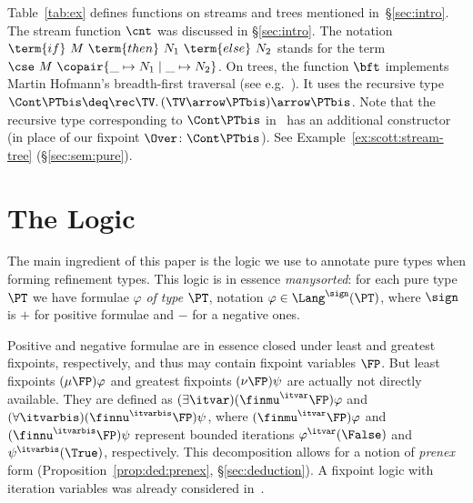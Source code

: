 \begin{example}
\label{ex:pure:fun}
Table~\ref{tab:ex} defines functions on streams and trees
mentioned in~\S\ref{sec:intro}.
%
The stream function $\cnt$ was discussed in \S\ref{sec:intro}.
The notation
$\term{if}~ M ~\term{then}~ N_{1} ~\term{else}~ N_{2}$
stands for the term
$\cse\ M\ \copair{\_ \mapsto N_1 \mid \_ \mapsto N_2}$.
%
On trees, the function $\bft$ implements Martin Hofmann's breadth-first traversal
(see e.g.~\cite{bms19types,jr21esop,rk25wollic,kw26popl}).
It uses the recursive type
$\Cont \PTbis \deq \rec\TV.\, (\TV \arrow \PTbis) \arrow \PTbis$.
Note that the recursive type corresponding to $\Cont \PTbis$
in~\cite{bms19types,jr21esop,kw26popl}
has an additional constructor
(in place of our fixpoint $\Over \colon \Cont\PTbis$).
See Example~\ref{ex:scott:stream-tree} (\S\ref{sec:sem:pure}).
\lipicsEnd
\end{example}




\section{The Logic}
\label{sec:log}

The main ingredient of this paper is the logic 
we use to annotate pure types when forming refinement types.
This logic is in essence \emph{manysorted}:
for each pure type $\PT$ we have formulae $\varphi$ \emph{of type $\PT$},
notation $\varphi \in \Lang^\sign(\PT)$,
where $\sign$ is $+$ for positive formulae and $-$ for a negative ones.

Positive and negative formulae are in essence closed under
least and greatest fixpoints, respectively,
and thus may contain fixpoint variables $\FP$.
%
But least fixpoints $(\mu \FP)\varphi$
and greatest fixpoints $(\nu \FP)\psi$ are actually not directly available.
They are defined %
as $(\exists \itvar)(\finmu^\itvar \FP)\varphi$
and $(\forall \itvarbis)(\finnu^\itvarbis \FP)\psi$,
where $(\finmu^\itvar \FP)\varphi$ and $(\finnu^\itvarbis \FP)\psi$
represent bounded iterations
$\varphi^{\itvar}(\False)$ and $\psi^{\itvarbis}(\True)$,
respectively.
This decomposition allows for a notion of \emph{prenex} form
(Proposition~\ref{prop:ded:prenex}, \S\ref{sec:deduction}).
%
A fixpoint logic with iteration variables was already
considered in~\cite{sd03fossacs}.

